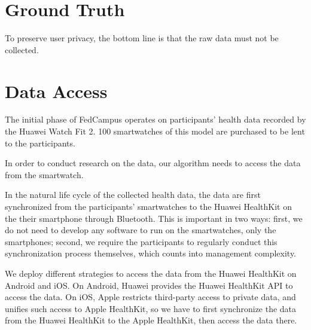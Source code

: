 \section{Ground Truth}

To preserve user privacy,
the bottom line is that the raw data must not be collected.

\section{Data Access}

The initial phase of FedCampus operates on participants' health data recorded by
the Huawei Watch Fit 2.
100 smartwatches of this model are purchased to be lent to the participants.

In order to conduct research on the data,
our algorithm needs to access the data from the smartwatch.

In the natural life cycle of the collected health data,
the data are first synchronized from the participants' smartwatches to
the Huawei HealthKit on the their smartphone through Bluetooth.
This is important in two ways:
first, we do not need to develop any software to run on the smartwatches,
only the smartphones; second,
we require the participants to regularly conduct this synchronization process
themselves, which counts into management complexity.

We deploy different strategies to access the data from the Huawei HealthKit on
Android and iOS.
On Android, Huawei provides the Huawei HealthKit API to access the data.
On iOS, Apple restricts third-party access to private data,
and unifies such access to Apple HealthKit,
so we have to first synchronize the data from the Huawei HealthKit to
the Apple HealthKit, then access the data there.
